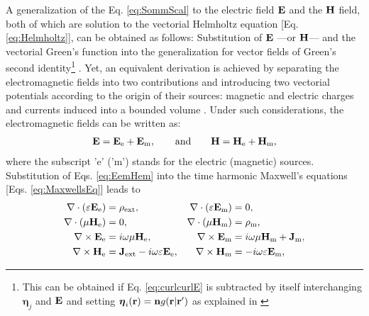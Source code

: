 A generalization of the Eq. \eqref{eq:SommScal} to the electric field $\vb{E}$ and the $\vb{H}$ field, both of which are solution to the vectorial Helmholtz equation [Eq. \eqref{eq:Helmholtz}], can be obtained as follows: Substitution of  $\vb{E}$ ---or $\vb{H}$--- and the vectorial Green's function into the generalization for vector fields of Green's second identity\footnote{This can be obtained if  Eq. \eqref{eq:curlcurlE} is subtracted by itself interchanging $\boldsymbol{\eta}_j $ and $\vb{E}$ and setting $\boldsymbol{\eta}_i(\vb{r}) = \vb{n}g(\vb{r}|\vb{r}')$ as explained in \cite{zangwill_modern_2013}} \cite{schot_eighty_1992,silver_microwave_1984,colton_inverse_2019}. Yet, an equivalent derivation is achieved by separating the electromagnetic fields into two contributions and introducing  two vectorial potentials according to the origin of their sources: magnetic and electric  charges and currents induced into a bounded volume \cite{jin_theory_2010,bondeson_computational_2005}. Under such considerations, the electromagnetic fields can be written as:
%
\begin{align}
\vb{E} = \vb{E}_\text{e} + \vb{E}_\text{m},
    \qquad
    \text{and}
    \qquad
\vb{H} = \vb{H}_\text{e} + \vb{H}_\text{m},
\label{eq:EemHem}
\end{align}
%
where the subscript 'e' ('m') stands for the electric (magnetic) sources\cite{jin_theory_2010}. Substitution of Eqs. \eqref{eq:EemHem} into the time harmonic Maxwell's equations [Eqs. \eqref{eq:MaxwellsEq}] leads to
%
\begin{subequations}
    \label{eq:MaxwellsEq-em}
\begin{align}
    \nabla \cdot \qty(\varepsilon \vb{E}_\text{e})  &= \rho_\text{ext},
                    &\nabla \cdot \qty(\varepsilon \vb{E}_\text{m})  &= 0,\\
    \nabla \cdot  (\mu\vb{H}_\text{e})  &= 0,
                    & \nabla \cdot  (\mu\vb{H}_\text{m})  &= \rho_\text{m},\\
    \nabla \times \vb{E}_\text{e}  &= i\omega \mu \vb{H}_\text{e},
                    & \nabla \times \vb{E}_\text{m}  &= i\omega \mu \vb{H}_\text{m} + \vb{J}_\text{m},\\
    \nabla \times \vb{H}_\text{e}  &= \vb{J}_\text{ext} - i\omega \varepsilon \vb{E}_\text{e},
                & \nabla \times \vb{H}_\text{m}  &=- i\omega \varepsilon \vb{E}_\text{m},
\end{align}
\end{subequations}
